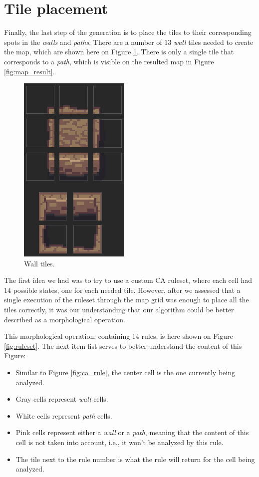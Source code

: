 \section{Tile placement}

Finally, the last step of the generation is to place the tiles to their corresponding spots in the \emph{walls} and \emph{paths}. There are a number of \(13\) \emph{wall} tiles needed to create the map, which are shown here on Figure \ref{fig:wall_tiles}. There is only a single tile that corresponds to a \emph{path}, which is visible on the resulted map in Figure \ref{fig:map_result}.

\begin{figure}[h]
    \caption{Wall tiles.}
    \centerline{\includegraphics{images/development/wall_tiles.png}}
    \label{fig:wall_tiles}
\end{figure}

The first idea we had was to try to use a custom CA ruleset, where each cell had \(14\) possible states, one for each needed tile. However, after we assessed that a single execution of the ruleset through the map grid was enough to place all the tiles correctly, it was our understanding that our algorithm could be better described as a morphological operation.

This morphological operation, containing 14 rules, is here shown on Figure \ref{fig:ruleset}. The next item list serves to better understand the content of this Figure:

\begin{itemize}
    \item Similar to Figure \ref{fig:ca_rule}, the center cell is the one currently being analyzed.
    \item Gray cells represent \emph{wall} cells.
    \item White cells represent \emph{path} cells.
    \item Pink cells represent either a \emph{wall} or a \emph{path}, meaning that the content of this cell is not taken into account, i.e., it won't be analyzed by this rule.
    \item The tile next to the rule number is what the rule will return for the cell being analyzed. 
\end{itemize}

